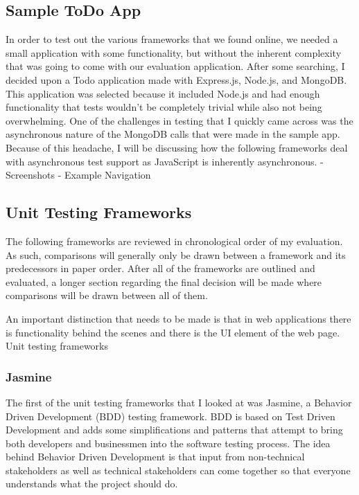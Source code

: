 \documentclass[11pt]{article}
\begin{document}
\subsection{Sample ToDo App}
In order to test out the various frameworks that we found online, we needed a small application with some functionality, but without the inherent complexity that was going to come with our evaluation application. After some searching, I decided upon a Todo application made with Express.js, Node.js, and MongoDB. \cite{ToDoAppHomePage} This application was selected because it included Node.js and had enough functionality that tests wouldn't be completely trivial while also not being overwhelming.
One of the challenges in testing that I quickly came across was the asynchronous nature of the MongoDB calls that were made in the sample app. Because of this headache, I will be discussing how the following frameworks deal with asynchronous test support as JavaScript is inherently asynchronous.
- Screenshots
- Example Navigation

\subsection{Unit Testing Frameworks}
The following frameworks are reviewed in chronological order of my evaluation. As such, comparisons will generally only be drawn between a framework and its predecessors in paper order. After all of the frameworks are outlined and evaluated, a longer section regarding the final decision will be made where comparisons will be drawn between all of them. 

An important distinction that needs to be made is that in web applications there is functionality behind the scenes and there is the UI element of the web page. Unit testing frameworks 

\subsubsection{Jasmine \cite{Jasmine}}
The first of the unit testing frameworks that I looked at was Jasmine, a Behavior Driven Development (BDD) testing framework. BDD is based on Test Driven Development and adds some simplifications and patterns that attempt to bring both developers and businessmen into the software testing process. The idea behind Behavior Driven Development is that input from non-technical stakeholders as well as technical stakeholders can come together so that everyone understands what the project should do.
\end{document}
